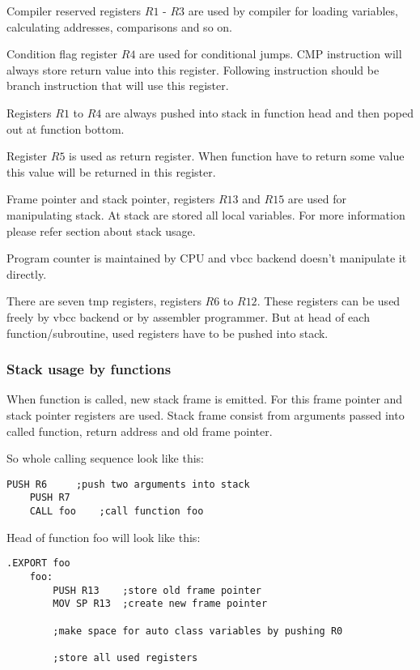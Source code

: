 Compiler reserved registers $R1$ - $R3$ are used by compiler for loading
variables, calculating addresses, comparisons and so on.

Condition flag register $R4$ are used for conditional jumps. CMP instruction
will always store return value into this register. Following instruction should
be branch instruction that will use this register.

Registers $R1$ to $R4$ are always pushed into stack in function head and then
poped out at function bottom.

Register $R5$ is used as return register. When function have to return some value
this value will be returned in this register.

Frame pointer and stack pointer, registers $R13$ and $R15$ are used for manipulating
stack. At stack are stored all local variables. For more information please refer
section about stack usage.

Program counter is maintained by CPU and vbcc backend doesn't manipulate it directly.

There are seven tmp registers, registers $R6$ to $R12$. These registers can be
used freely by vbcc backend or by assembler programmer. But at head of each
function/subroutine, used registers have to be pushed into stack.

\subsubsection{Stack usage by functions}

When function is called, new stack frame is emitted. For this frame pointer and
stack pointer registers are used. Stack frame consist from arguments passed into
called function, return address and old frame pointer.

So whole calling sequence look like this:

\begin{lstlisting}[language={[markII]Assembler}, frame=single]
    PUSH R6     ;push two arguments into stack
    PUSH R7
    CALL foo    ;call function foo
\end{lstlisting}

Head of function foo will look like this:

\begin{lstlisting}[language={[markII]Assembler}, frame=single]
    .EXPORT foo
    foo:
        PUSH R13    ;store old frame pointer
        MOV SP R13  ;create new frame pointer

        ;make space for auto class variables by pushing R0

        ;store all used registers
\end{lstlisting}

